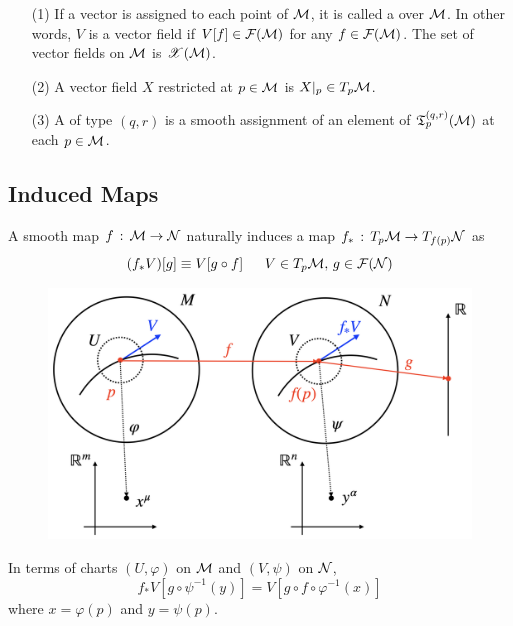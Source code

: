 \documentclass[a4paper, 10pt]{article}
\begin{document}
\begin{definition}
    \hphantom{.}
    \begin{itemize}
        \item[(1)] If a vector is assigned  to each point of $\mathcal{M}$, it is called a  over $\mathcal{M}$. In other words, $V$ is a vector field if $V[f] \in \mathcal{F}(\mathcal{M})$ for any $f \in \mathcal{F}(\mathcal{M})$. The set of vector fields on $\mathcal{M}$ is $\mathscr{X}(\mathcal{M})$.
        \item[(2)] A vector field $X$ restricted at $p \in \mathcal{M}$ is $X|_{p} \in T_{p}\mathcal{M}$.
        \item[(3)] A  of type $(q,r)$ is a smooth assignment of an element of $\mathfrak{T}_{p}^{(q,r)}(\mathcal{M})$ at each $p \in \mathcal{M}$.
    \end{itemize}
\end{definition}

\subsection{Induced Maps}

\begin{definition}[Pushforward]
    A smooth map $f \,:\, \mathcal{M} \rightarrow \mathcal{N}$ naturally induces a  map $f_{\ast} \,:\, T_{p}\mathcal{M} \rightarrow T_{f(p)}\mathcal{N}$ as
    \[ (f_{\ast}V)[g] \equiv V[g \circ f] \; \text{\quad} \; V \in T_{p}\mathcal{M},\, g \in \mathcal{F}(\mathcal{N}) \]
\end{definition}

\begin{figure}[htbp]
    \centering
    \includegraphics[width=0.8\linewidth]{../images/lecture06/6_02.png}
\end{figure}

In terms of charts $(U, \varphi)$ on $\mathcal{M}$ and $(V, \psi)$ on $\mathcal{N}$,
\[ f_{\ast}V[g \circ \psi^{-1}(y)] = V[g\circ f \circ \varphi^{-1}(x)] \]
where $x = \varphi(p)$ and $y = \psi(p)$.
\newpage
\end{document}
